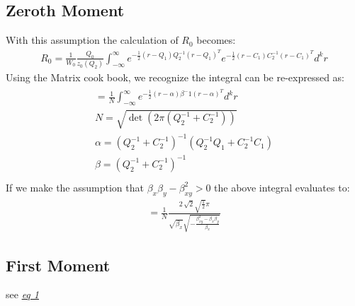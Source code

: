 \documentclass[letterpaper,10pt,english]{sphinxmanual}
\begin{document}
\subsection{Zeroth Moment}
\label{\detokenize{algorithmWriteup:zeroth-moment}}
With this assumption the calculation of \(R_0\) becomes:
\begin{equation*}
\begin{split}R_0 = \frac{1}{W_0}\frac{Q_0}{z_0(Q_2)}\int_{-\infty}^{\infty}
      e^{-\frac{1}{2}(r-Q_1)Q_2^{-1}(r-Q_1)^T} e^{-\frac{1}{2}(r-C_1)C_2^{-1}
      (r-C_1)^T} d^kr\end{split}
\end{equation*}
Using the Matrix cook book, we recognize the integral can be re-expressed as:
\begin{align*}\!\begin{aligned}
= \frac{1}{N}\int_{-\infty}^{\infty}e^{-\frac{1}{2}(r-\alpha)\beta^-1
                                       (r-\alpha)^T}d^kr\\
N = \sqrt{\det(2\pi(Q_2^{-1} + C_2^{-1}))}\\
\alpha = (Q_2^{-1} + C_2^{-1})^{-1}(Q_2^{-1}Q_1 + C_2^{-1}C_1)\\
\beta = (Q_2^{-1} + C_2^{-1})^{-1}\\
\end{aligned}\end{align*}
If we make the assumption that \(\beta_x\beta_y - \beta_{xy}^2 > 0\) the
above integral evaluates to:
\begin{equation*}
\begin{split}= \frac{1}{N}\frac{2 \, \sqrt{2} \sqrt{\frac{1}{2}} \pi}{\sqrt{\beta_{x}}
  \sqrt{-\frac{\beta_{\mathit{xy}}^{2} - \beta_{x} \beta_{y}}{\beta_{x}}}}\end{split}
\end{equation*}

\subsection{First Moment}
\label{\detokenize{algorithmWriteup:first-moment}}
see {\hyperref[\detokenize{algorithmWriteup:first_raw_moment}]{\emph{eq 1}}}



\renewcommand{\indexname}{Index}
\printindex
\end{document}
